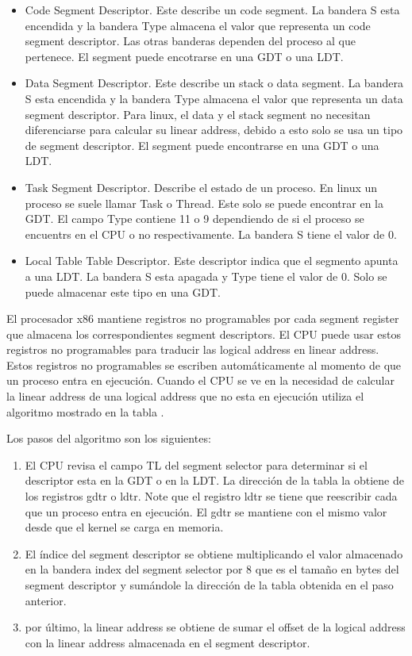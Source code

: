 \begin{itemize}
\item Code Segment Descriptor. Este describe un code segment. La bandera S esta
  encendida y la bandera Type almacena el valor que representa un code segment
  descriptor. Las otras banderas dependen del proceso al que pertenece. El
  segment puede encotrarse en una GDT o una LDT.
\item Data Segment Descriptor. Este describe un stack o data segment. La
  bandera S esta encendida y la bandera Type almacena el valor que representa
  un data segment descriptor. Para linux, el data y el stack segment no
  necesitan diferenciarse para calcular su linear address, debido a esto solo
  se usa un tipo de segment descriptor. El segment puede encontrarse en una GDT
  o una LDT.
\item Task Segment Descriptor. Describe el estado de un proceso. En linux un
  proceso se suele llamar Task o Thread. Este solo se puede encontrar en la
  GDT. El campo Type contiene 11 o 9 dependiendo de si el proceso se encuentrs
  en el CPU o no respectivamente. La bandera S tiene el valor de 0.
\item Local Table Table Descriptor. Este descriptor indica que el segmento
  apunta a una LDT. La bandera S esta apagada y Type tiene el valor de 0. Solo
  se puede almacenar este tipo en una GDT.
\end{itemize}

El procesador x86 mantiene registros no programables por cada segment register
que almacena los correspondientes segment descriptors. El CPU puede usar estos
registros no programables para traducir las logical address en linear
address. Estos registros no programables se escriben automáticamente al momento
de que un proceso entra en ejecución. Cuando el CPU se ve en la necesidad de
calcular la linear address de una logical address que no esta en ejecución
utiliza el algoritmo mostrado en la tabla {}.

Los pasos del algoritmo son los siguientes:
\begin{enumerate}
\item El CPU revisa el campo TL del segment selector para determinar si el
  descriptor esta en la GDT o en la LDT. La dirección de la tabla la obtiene de
  los registros gdtr o ldtr. Note que el registro ldtr se tiene que reescribir
  cada que un proceso entra en ejecución. El gdtr se mantiene con el mismo
  valor desde que el kernel se carga en memoria.
\item El índice del segment descriptor se obtiene multiplicando el valor
  almacenado en la bandera index del segment selector por 8 que es el tamaño en
  bytes del segment descriptor y sumándole la dirección de la tabla obtenida en
  el paso anterior.
\item por último, la linear address se obtiene de sumar el offset de la logical
  address con la linear address almacenada en el segment descriptor.
\end{enumerate} 

